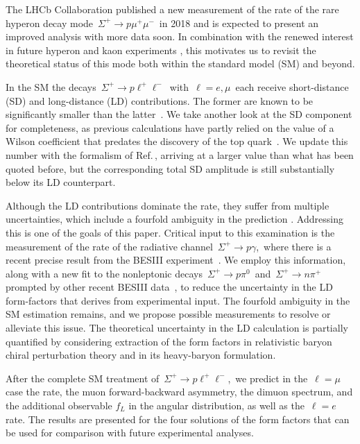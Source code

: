 \documentclass[amsmath,amssymb,aps,nofootinbib,prd,preprint,superscriptaddress,tightenlines,a4paper,bm]{revtex4-2}
\begin{document}
The LHCb Collaboration published a new measurement of the rate of the rare hyperon decay mode \,$\Sigma^+\to p\mu^+\mu^-$\, in 2018 \cite{LHCb:2017rdd} and is expected to present an improved analysis with more data soon. In combination with the renewed interest in future hyperon and kaon experiments \cite{Li:2016tlt,AlvesJunior:2018ldo,LHCb:2018roe,Cerri:2018ypt,Goudzovski:2022vbt,Anzivino:2023bhp}, this motivates us to revisit the theoretical status of this mode both within the standard model (SM) and beyond.

In the SM the decays \,$\Sigma^+\to p\ell^+\ell^-$\, with \,$\ell=e,\mu$\, each receive short-distance (SD) and long-distance (LD) contributions. The former are known to be significantly smaller than the latter~\cite{He:2005yn}.
We take another look at the SD component for completeness, as previous calculations have partly relied on the value of a Wilson coefficient that predates the discovery of the top quark~\cite{Shifman:1976de}.
We update this number with the formalism of Ref.\,\cite{Buchalla:1995vs}, arriving at a larger value than what has been quoted before, but the corresponding total SD amplitude is still substantially below its LD counterpart.

Although the LD contributions dominate the rate, they suffer from multiple uncertainties, which include a fourfold ambiguity in the prediction \cite{He:2005yn}.
Addressing this is one of the goals of this paper. Critical input to this examination is the measurement of the rate of the radiative channel \,$\Sigma^+\to p\gamma$,\, where there is a recent precise result from the BESIII experiment~\cite{BESIII:2023fhs}.
We employ this information, along with a new fit to the nonleptonic decays \,$\Sigma^+\to p\pi^0$\, and \,$\Sigma^+\to n\pi^+$\, prompted by other recent BESIII data~\cite{BESIII:2020fqg,BESIII:2023sgt}, to reduce the uncertainty in the LD form-factors that derives from experimental input.
The fourfold ambiguity in the SM estimation remains, and we propose possible measurements to resolve or alleviate this issue.
The theoretical uncertainty in the LD calculation is partially quantified by considering extraction of the form factors in relativistic baryon chiral perturbation theory and in its heavy-baryon formulation.

After the complete SM treatment of \,$\Sigma^+\to p\ell^+\ell^-$,\, we predict in the \,$\ell=\mu$\, case the rate, the muon forward-backward asymmetry, the dimuon spectrum, and the additional observable $f_L^{}$ in the angular distribution, as well as the \,$\ell=e$\, rate.
The results are presented for the four solutions of the form factors that can be used for comparison with future experimental analyses.
\end{document}
